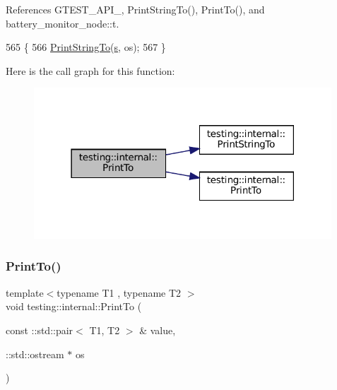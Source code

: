 References G\+T\+E\+S\+T\+\_\+\+A\+P\+I\+\_\+, Print\+String\+To(), Print\+To(), and battery\+\_\+monitor\+\_\+node\+::t.


\begin{DoxyCode}
565                                                         \{
566   \hyperlink{namespacetesting_1_1internal_a8b53e46cea3f8bdfc9342057c4f6ba62}{PrintStringTo}(\hyperlink{namespaceservice__node__3_aa976421a49e0b54f23833423400849ae}{s}, os);
567 \}
\end{DoxyCode}
Here is the call graph for this function\+:
\nopagebreak
\begin{figure}[H]
\begin{center}
\leavevmode
\includegraphics[width=316pt]{namespacetesting_1_1internal_af59b4f5d83276cd807c45063b14bad44_cgraph}
\end{center}
\end{figure}
\mbox{\label{namespacetesting_1_1internal_af2c33928facbf2edf7af564278724d98}} 
\subsubsection{\texorpdfstring{Print\+To()}{PrintTo()}\hspace{0.1cm}{\footnotesize\ttfamily [19/20]}}
{\footnotesize\ttfamily template$<$typename T1 , typename T2 $>$ \\
void testing\+::internal\+::\+Print\+To (\begin{DoxyParamCaption}\item[{const \+::std\+::pair$<$ T1, T2 $>$ \&}]{value,  }\item[{\+::std\+::ostream $\ast$}]{os }\end{DoxyParamCaption})}



